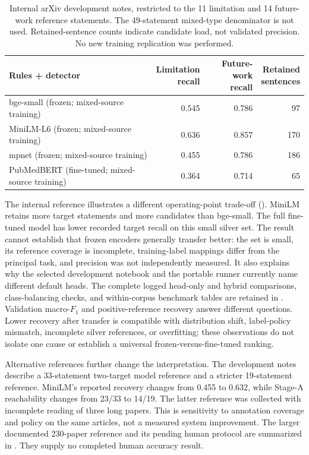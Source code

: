 \begin{table}[t]
\centering
\small
\caption{Internal arXiv development notes, restricted to the 11 limitation and 14 future-work
reference statements. The 49-statement mixed-type denominator is not used. Retained-sentence
counts indicate candidate load, not validated precision. No new training replication was performed.}
\label{T:transfer}
\begin{tabular}{@{}lrrr@{}}
\toprule
Rules + detector & \shortstack{Limitation\\recall} & \shortstack{Future-work\\recall} & \shortstack{Retained\\sentences} \\
\midrule
bge-small (frozen; mixed-source training) & 0.545 & 0.786 & 97 \\
MiniLM-L6 (frozen; mixed-source training) & 0.636 & 0.857 & 170 \\
mpnet (frozen; mixed-source training) & 0.455 & 0.786 & 186 \\
PubMedBERT (fine-tuned; mixed-source training) & 0.364 & 0.714 & 65 \\
\bottomrule
\end{tabular}
\end{table}

The internal reference illustrates a different operating-point trade-off
(). MiniLM retains more target statements and more candidates than bge-small.
The full fine-tuned model has lower recorded target recall on this small silver set. The result
cannot establish that frozen encoders generally transfer better: the set is small, its reference
coverage is incomplete, training-label mappings differ from the principal task, and precision
was not independently measured. It also explains why the selected development notebook and the
portable runner currently name different default heads. The complete logged head-only and
hybrid comparisons, class-balancing checks, and within-corpus benchmark tables are retained in
. Validation macro-$F_1$ and positive-reference recovery answer different
questions. Lower recovery after transfer is compatible with distribution shift, label-policy
mismatch, incomplete silver references, or overfitting; these observations do not isolate one
cause or establish a universal frozen-versus-fine-tuned ranking.

Alternative references further change the interpretation. The development notes describe a
33-statement two-target model reference and a stricter 19-statement reference. MiniLM's reported
recovery changes from 0.455 to 0.632, while Stage-A reachability changes from 23/33 to 14/19.
The latter reference was collected with incomplete reading of three long papers. This is
sensitivity to annotation coverage and policy on the same articles, not a measured system
improvement. The larger documented 230-paper reference and its pending human protocol are
summarized in . They supply no completed human accuracy result.

